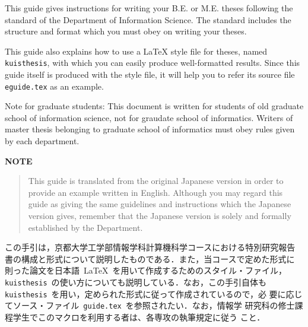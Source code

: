 \documentclass[master,english]{kuisthesis}
\date{February 12th, 2019}
\begin{document}
\maketitle					%

\begin{eabstract}				%
This guide gives instructions for writing your B.E. or M.E. theses following
the standard of the Department of Information Science.  The
standard includes the structure and format which you must obey on writing
your theses.

This guide also explains how to use a \LaTeX{} style file for theses, named
\verb|kuisthesis|, with which you can easily produce well-formatted results.
Since this guide itself is produced with the style file, it will help you to
refer its source file \verb|eguide.tex| as an example.

Note for graduate students: This document is written for students of
old graduate school of information science, not for graudate school of
informatics. Writers of master thesis belonging to graduate school
of informatics must obey rules given by each department.

\par\bigskip\centerline{\bf NOTE}
\begin{quote}
  This guide is translated from the original Japanese version in order
  to provide an example written in English.  Although you may regard
  this guide as giving the same guidelines and instructions which the
  Japanese version gives, remember that the Japanese version is solely
  and formally established by the Department.
\end{quote}
\end{eabstract}

\begin{jabstract}				%
この手引は，京都大学工学部情報学科計算機科学コースにおける特別研究報告
書の構成と形式について説明したものである．また，当コースで定めた形式に
則った論文を日本語~\LaTeX~を用いて作成するためのスタイル・ファイル，
\verb|kuisthesis|~の使い方についても説明している．なお，この手引自体も
\verb|kuisthesis|~を用い，定められた形式に従って作成されているので，必
要に応じてソース・ファイル~\verb|guide.tex|~を参照されたい．なお，情報学
研究科の修士課程学生でこのマクロを利用する者は、各専攻の執筆規定に従う
こと．
\end{jabstract}
\end{document}
